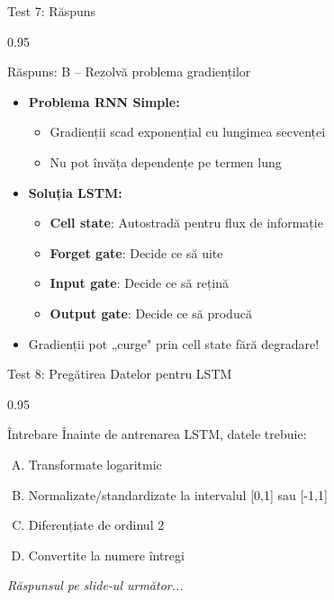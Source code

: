 \documentclass[9pt, aspectratio=169, t]{beamer}
\begin{document}
\begin{frame}{Test 7: Răspuns}
    \begin{cminipage}{0.95\textwidth}
    \begin{exampleblock}{Răspuns: B -- Rezolvă problema gradienților}
        \begin{itemize}\setlength{\itemsep}{0pt}
            \item \textbf{Problema RNN Simple:}
            \begin{itemize}\setlength{\itemsep}{0pt}
                \item Gradienții scad exponențial cu lungimea secvenței
                \item Nu pot învăța dependențe pe termen lung
            \end{itemize}
            \item \textbf{Soluția LSTM:}
            \begin{itemize}\setlength{\itemsep}{0pt}
                \item \textbf{Cell state}: Autostradă pentru flux de informație
                \item \textbf{Forget gate}: Decide ce să uite
                \item \textbf{Input gate}: Decide ce să rețină
                \item \textbf{Output gate}: Decide ce să producă
            \end{itemize}
            \item Gradienții pot „curge" prin cell state fără degradare!
        \end{itemize}
    \end{exampleblock}
    \end{cminipage}
\end{frame}

\begin{frame}{Test 8: Pregătirea Datelor pentru LSTM}
    \begin{cminipage}{0.95\textwidth}
    \begin{alertblock}{Întrebare}
        Înainte de antrenarea LSTM, datele trebuie:
    \end{alertblock}

    \vspace{0.3cm}

    \begin{enumerate}[A)]\setlength{\itemsep}{0pt}
        \item Transformate logaritmic
        \item Normalizate/standardizate la intervalul [0,1] sau [-1,1]
        \item Diferențiate de ordinul 2
        \item Convertite la numere întregi
    \end{enumerate}

    \vspace{0.5cm}
    \begin{flushright}\textit{Răspunsul pe slide-ul următor...}\end{flushright}
    \end{cminipage}
\end{frame}
\end{document}
